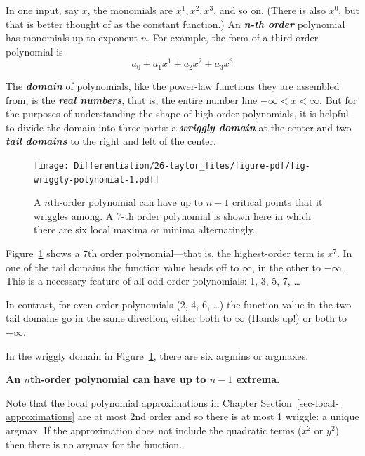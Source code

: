 \documentclass[
  letterpaper,
  DIV=11,
  numbers=noendperiod,
  oneside]{scrreprt}
\begin{document}
In one input, say \(x\), the monomials are \(x^1, x^2, x^3\), and so on.
(There is also \(x^0\), but that is better thought of as the constant
function.) An \textbf{\emph{n-th order}} polynomial has monomials up to
exponent \(n\). For example, the form of a third-order polynomial is
\[a_0 + a_1 x^1 + a_2 x^2 + a_3 x^3\]

The \textbf{\emph{domain}} of polynomials, like the power-law functions
they are assembled from, is the \textbf{\emph{real numbers}}, that is,
the entire number line \(-\infty < x < \infty\). But for the purposes of
understanding the shape of high-order polynomials, it is helpful to
divide the domain into three parts: a \textbf{\emph{wriggly domain}} at
the center and two \textbf{\emph{tail domains}} to the right and left of
the center.

\begin{figure}

{\centering \texttt{[image: Differentiation/26-taylor\_files/figure-pdf/fig-wriggly-polynomial-1.pdf]}

}

\caption{\label{fig-wriggly-polynomial}A \(n\)th-order polynomial can
have up to \(n-1\) critical points that it wriggles among. A 7-th order
polynomial is shown here in which there are six local maxima or minima
alternatingly.}

\end{figure}

Figure~\ref{fig-wriggly-polynomial} shows a 7th order polynomial---that
is, the highest-order term is \(x^7\). In one of the tail domains the
function value heads off to \(\infty\), in the other to \(-\infty\).
This is a necessary feature of all odd-order polynomials: 1, 3, 5, 7,
\ldots{}

In contrast, for even-order polynomials (2, 4, 6, \ldots) the function
value in the two tail domains go in the same direction, either both to
\(\infty\) (Hands up!) or both to \(-\infty\).

In the wriggly domain in Figure~\ref{fig-wriggly-polynomial}, there are
six argmins or argmaxes.

\textbf{An \(n\)th-order polynomial can have up to \(n-1\) extrema.}

Note that the local polynomial approximations in Chapter
Section~\ref{sec-local-approximations} are at most 2nd order and so
there is at most 1 wriggle: a unique argmax. If the approximation does
not include the quadratic terms (\(x^2\) or \(y^2\)) then there is no
argmax for the function.
\end{document}
